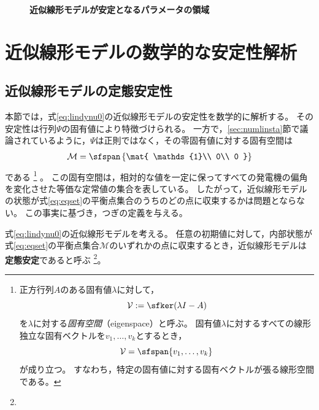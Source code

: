 \documentclass[tombow,dvipdfmx]{corona-a5-1.1}
\begin{document}
\begin{figure}[t!]
{    
}
 \medskip
 \caption{\textbf{近似線形モデルが安定となるパラメータの領域}}
 \label{fig:gamsta}
\medskip
\end{figure}


\section{近似線形モデルの数学的な安定性解析\advanced}\label{sec:linmathana}

\subsection{近似線形モデルの定態安定性\advanced}

本節では，式\ref{eq:lindynu0}の近似線形モデルの安定性を数学的に解析する。
その安定性は行列$\Psi$の固有値により特徴づけられる。
一方で，\ref{sec:numlinsta}節で議論されているように，$\Psi$は正則ではなく，その零固有値に対する固有空間は
\begin{align}\label{eq:eqset}
\mathcal{M} =
 \sfspan\left\{
 \mat{
 \mathds{1}\\
 0\\
 0
 }
 \right\}
\end{align}
である
\footnote{
正方行列$A$のある固有値$\lambda$に対して，
\[
\mathcal{V}:= \sfker (\lambda I -A)
\]
を$\lambda$に対する\emph{固有空間}（eigenspace）と呼ぶ。
固有値$\lambda$に対するすべての線形独立な固有ベクトルを$v_1,\ldots,v_k$とするとき，
\[
\mathcal{V} = \sfspan\{v_1,\ldots,v_k\}
\]
が成り立つ。
すなわち，特定の固有値に対する固有ベクトルが張る線形空間である。
}
。
この固有空間は，相対的な値を一定に保ってすべての発電機の偏角を変化させた等価な定常値の集合を表している。
したがって，近似線形モデルの状態が式\ref{eq:eqset}の平衡点集合のうちのどの点に収束するかは問題とならない。
この事実に基づき，つぎの定義を与える。

\begin{定義}[近似線形モデルの定態安定性]
\label{def:stalin}
式\ref{eq:lindynu0}の近似線形モデルを考える。
任意の初期値に対して，内部状態が式\ref{eq:eqset}の平衡点集合$\mathcal{M}$のいずれかの点に収束するとき，近似線形モデルは\textbf{定態安定}であると呼ぶ
\footnote{
}。
\end{定義}
\end{document}

